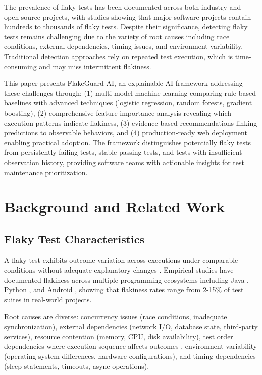 \documentclass[conference]{IEEEtran}
\begin{document}
The prevalence of flaky tests has been documented across both industry and open-source projects, with studies showing that major software projects contain hundreds to thousands of flaky tests. Despite their significance, detecting flaky tests remains challenging due to the variety of root causes including race conditions, external dependencies, timing issues, and environment variability. Traditional detection approaches rely on repeated test execution, which is time-consuming and may miss intermittent flakiness.

This paper presents FlakeGuard AI, an explainable AI framework addressing these challenges through: (1) multi-model machine learning comparing rule-based baselines with advanced techniques (logistic regression, random forests, gradient boosting), (2) comprehensive feature importance analysis revealing which execution patterns indicate flakiness, (3) evidence-based recommendations linking predictions to observable behaviors, and (4) production-ready web deployment enabling practical adoption. The framework distinguishes potentially flaky tests from persistently failing tests, stable passing tests, and tests with insufficient observation history, providing software teams with actionable insights for test maintenance prioritization.

\section{Background and Related Work}

\subsection{Flaky Test Characteristics}
A flaky test exhibits outcome variation across executions under comparable conditions without adequate explanatory changes \cite{bell2018deflaker}. Empirical studies have documented flakiness across multiple programming ecosystems including Java \cite{luo2014empirical}, Python \cite{gruber2021flakiness}, and Android \cite{thorve2018empirical}, showing that flakiness rates range from 2-15\% of test suites in real-world projects.

Root causes are diverse: concurrency issues (race conditions, inadequate synchronization), external dependencies (network I/O, database state, third-party services), resource contention (memory, CPU, disk availability), test order dependencies where execution sequence affects outcomes \cite{shi2019ifixflakies}, environment variability (operating system differences, hardware configurations), and timing dependencies (sleep statements, timeouts, async operations).
\end{document}
